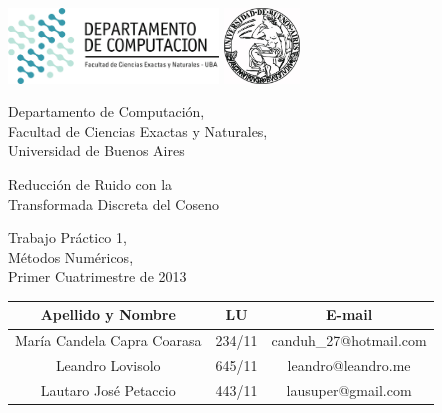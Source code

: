 \documentclass[a4paper,10pt,twoside]{article}
\begin{document}


\thispagestyle{caratula}

\begin{center}

\includegraphics[height=2cm]{DC.png} 
\hfill
\includegraphics[height=2cm]{UBA.jpg} 

\vspace{2cm}

Departamento de Computación,\\
Facultad de Ciencias Exactas y Naturales,\\
Universidad de Buenos Aires

\vspace{1cm}

\begin{spacing}{2.5}
\begin{Huge}
Reducción de Ruido con la \\Transformada Discreta del Coseno
\end{Huge}
\end{spacing}

\vspace{1cm}

Trabajo Práctico 1, \\
Métodos Numéricos, \\
Primer Cuatrimestre de 2013

\vspace{6cm}

\begin{tabular}{|c|c|c|}
\hline
Apellido y Nombre & LU & E-mail\\
\hline
María Candela Capra Coarasa & 234/11 & canduh\_27@hotmail.com\\
Leandro Lovisolo            & 645/11 & leandro@leandro.me\\
Lautaro José Petaccio       & 443/11 & lausuper@gmail.com\\
\hline
\end{tabular}

\end{center}
\vspace{1cm}
\end{document}
